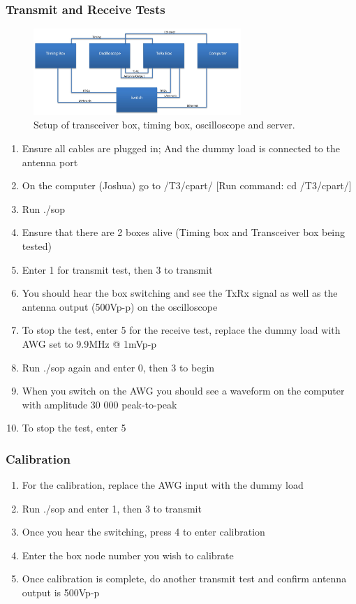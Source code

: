 \subsubsection{Transmit and Receive Tests}
\begin{figure}[H]
	\centering
	\includegraphics[width=0.7\textwidth]{images/hardware/txrx_setup.jpg}
	\caption{Setup of transceiver box, timing box, oscilloscope and server.}
	\label{fig:hw_txrx_setup}
\end{figure}

\begin{enumerate}
	\item Ensure all cables are plugged in; And the dummy load is connected to the antenna port
	\item On the computer (Joshua) go to /T3/cpart/ [Run command: cd /T3/cpart/]
	\item Run ./sop
	\item Ensure that there are 2 boxes alive (Timing box and Transceiver box being tested)
	\item Enter 1 for transmit test, then 3 to transmit
	\item You should hear the box switching and see the TxRx signal as well as the antenna output (500Vp-p) on the oscilloscope
	\item To stop the test, enter 5 for the receive test, replace the dummy load with AWG set to 9.9MHz @ 1mVp-p
	\item Run ./sop again and enter 0, then 3 to begin
	\item When you switch on the AWG you should see a waveform on the computer with amplitude 30 000 peak-to-peak
	\item To stop the test, enter 5
\end{enumerate}

\subsubsection{Calibration}

\begin{enumerate}
	\item For the calibration, replace the AWG input with the dummy load
	\item Run ./sop and enter 1, then 3 to transmit
	\item Once you hear the switching, press 4 to enter calibration
	\item Enter the box node number you wish to calibrate
	\item Once calibration is complete, do another transmit test and confirm antenna output is 500Vp-p
\end{enumerate}

